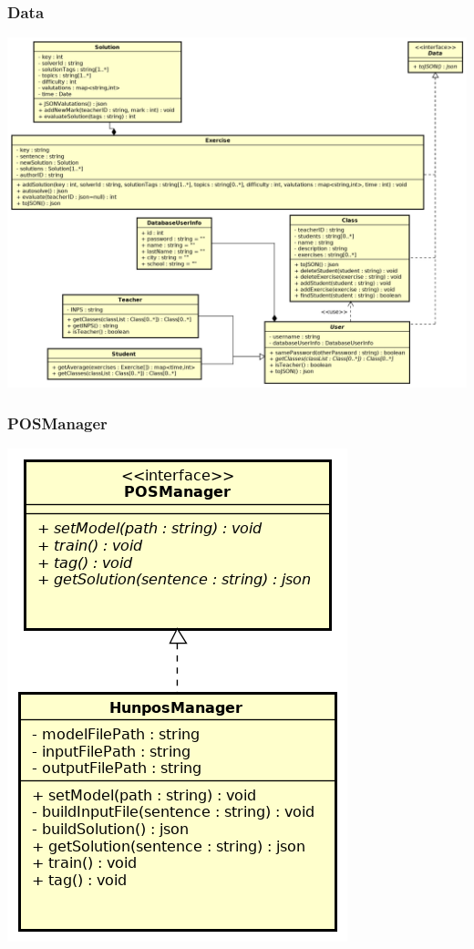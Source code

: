 \subsubsection{Data}
\includegraphics[scale=0.45]{images/Data.png}
\subsubsection{POSManager}
\includegraphics[scale=0.5]{images/POSManager.png}
